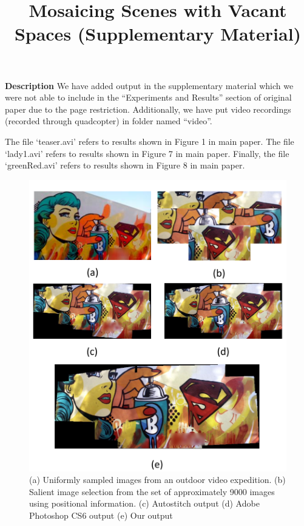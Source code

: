 \documentclass[10pt,twocolumn,letterpaper]{article}
\begin{document}
\title{Mosaicing Scenes with Vacant Spaces (Supplementary Material)}

\maketitle

\textbf{Description}
We have added output in the supplementary material which we were not able
to include in the ``Experiments and Results'' section of original paper due to
the page restriction. Additionally, we have put video recordings (recorded
through quadcopter) in folder named ``video''. 

The file `teaser.avi' refers to results shown in Figure 1 in main paper.
The file `lady1.avi' refers to results shown in Figure 7 in main paper.
Finally, the file `greenRed.avi' refers to results shown in Figure 8 in main
paper.
 

\begin{figure}[h!]
\centering
\includegraphics[width=0.87\linewidth]{figures/lady2.pdf}
\caption{ (a) Uniformly sampled images from an outdoor video
  expedition.  (b) Salient image selection from the set of
  approximately 9000 images using positional information. (c) Autostitch output
  (d) Adobe Photoshop CS6 output (e) Our output }
\label{fig:validResults}
\end{figure}
\end{document}
